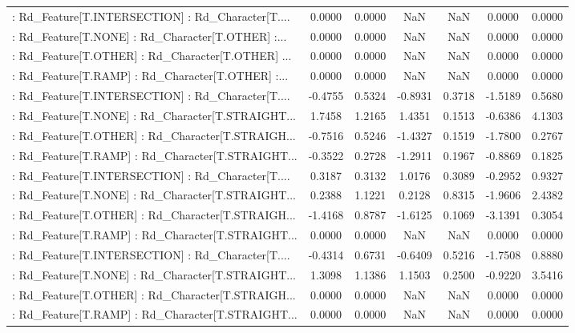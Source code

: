 \begin{longtable}{p{4cm}cccccc}
 : Rd\_Feature[T.INTERSECTION] : Rd\_Character[T.... &  0.0000 &    0.0000 &     NaN &          NaN &  0.0000 &  0.0000 \\
 : Rd\_Feature[T.NONE] : Rd\_Character[T.OTHER] :... &  0.0000 &    0.0000 &     NaN &          NaN &  0.0000 &  0.0000 \\
 : Rd\_Feature[T.OTHER] : Rd\_Character[T.OTHER] ... &  0.0000 &    0.0000 &     NaN &          NaN &  0.0000 &  0.0000 \\
 : Rd\_Feature[T.RAMP] : Rd\_Character[T.OTHER] :... &  0.0000 &    0.0000 &     NaN &          NaN &  0.0000 &  0.0000 \\
 : Rd\_Feature[T.INTERSECTION] : Rd\_Character[T.... & -0.4755 &    0.5324 & -0.8931 &       0.3718 & -1.5189 &  0.5680 \\
 : Rd\_Feature[T.NONE] : Rd\_Character[T.STRAIGHT... &  1.7458 &    1.2165 &  1.4351 &       0.1513 & -0.6386 &  4.1303 \\
 : Rd\_Feature[T.OTHER] : Rd\_Character[T.STRAIGH... & -0.7516 &    0.5246 & -1.4327 &       0.1519 & -1.7800 &  0.2767 \\
 : Rd\_Feature[T.RAMP] : Rd\_Character[T.STRAIGHT... & -0.3522 &    0.2728 & -1.2911 &       0.1967 & -0.8869 &  0.1825 \\
 : Rd\_Feature[T.INTERSECTION] : Rd\_Character[T.... &  0.3187 &    0.3132 &  1.0176 &       0.3089 & -0.2952 &  0.9327 \\
 : Rd\_Feature[T.NONE] : Rd\_Character[T.STRAIGHT... &  0.2388 &    1.1221 &  0.2128 &       0.8315 & -1.9606 &  2.4382 \\
 : Rd\_Feature[T.OTHER] : Rd\_Character[T.STRAIGH... & -1.4168 &    0.8787 & -1.6125 &       0.1069 & -3.1391 &  0.3054 \\
 : Rd\_Feature[T.RAMP] : Rd\_Character[T.STRAIGHT... &  0.0000 &    0.0000 &     NaN &          NaN &  0.0000 &  0.0000 \\
 : Rd\_Feature[T.INTERSECTION] : Rd\_Character[T.... & -0.4314 &    0.6731 & -0.6409 &       0.5216 & -1.7508 &  0.8880 \\
 : Rd\_Feature[T.NONE] : Rd\_Character[T.STRAIGHT... &  1.3098 &    1.1386 &  1.1503 &       0.2500 & -0.9220 &  3.5416 \\
 : Rd\_Feature[T.OTHER] : Rd\_Character[T.STRAIGH... &  0.0000 &    0.0000 &     NaN &          NaN &  0.0000 &  0.0000 \\
 : Rd\_Feature[T.RAMP] : Rd\_Character[T.STRAIGHT... &  0.0000 &    0.0000 &     NaN &          NaN &  0.0000 &  0.0000 \\

\end{longtable}
